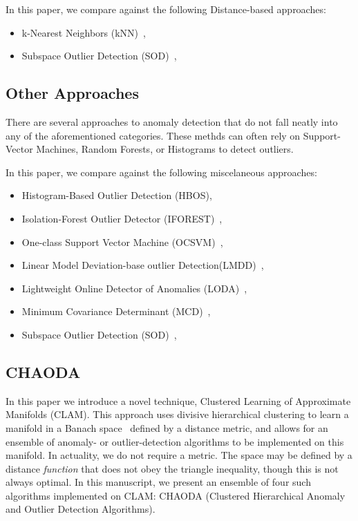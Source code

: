 In this paper, we compare against the following Distance-based approaches:
\begin{itemize}
    \item k-Nearest Neighbors (kNN)~\cite{ramaswamy2000efficient, sridhar2000knn, fabrizio2002knn},
    \item Subspace Outlier Detection (SOD)~\cite{kriegel2009sod},
\end{itemize}


\subsection{Other Approaches}
\label{subsec:introduction:other-appraoches}

There are several approaches to anomaly detection that do not fall neatly into any of the aforementioned categories.
These methds can often rely on Support-Vector Machines, Random Forests, or Histograms to detect outliers.

In this paper, we compare against the following miscelaneous approaches:
\begin{itemize}
    \item Histogram-Based Outlier Detection (HBOS)\cite{goldstein2012hbos},
    \item Isolation-Forest Outlier Detector (IFOREST)~\cite{tony2008iforest,tony2012iforest},
    \item One-class Support Vector Machine (OCSVM)~\cite{sholkopf2001ocsvm},
    \item Linear Model Deviation-base outlier Detection(LMDD)~\cite{arning1996lmdd},
    \item Lightweight Online Detector of Anomalies (LODA)~\cite{pevny2016loda},
    \item Minimum Covariance Determinant (MCD)~\cite{rousseeuw1999mcd,hardin2004mcd},
    \item Subspace Outlier Detection (SOD)~\cite{kriegel2009sod},
\end{itemize}


\subsection{CHAODA}
\label{subsec:introduction:chaoda}

In this paper we introduce a novel technique, Clustered Learning of Approximate Manifolds (CLAM).
This approach uses divisive hierarchical clustering to learn a manifold in a Banach space~\cite{banach1929fonctionnelles} defined by a distance metric, and allows for an ensemble of anomaly- or outlier-detection algorithms to be implemented on this manifold.
In actuality, we do not require a metric.
The space may be defined by a distance \textit{function} that does not obey the triangle inequality, though this is not always optimal.
In this manuscript, we present an ensemble of four such algorithms implemented on CLAM: CHAODA (Clustered Hierarchical Anomaly and Outlier Detection Algorithms).

